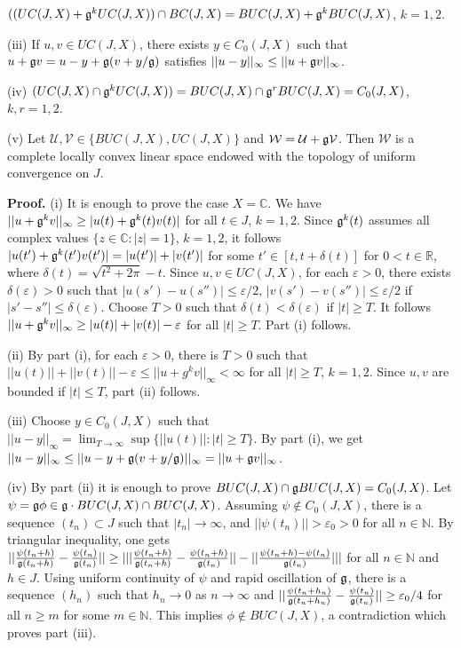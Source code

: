\documentclass[10pt,onside,reqno]{amsart}
\newcommand{\Cdb}{\mbox{$\mathbb{C}$}}
\newcommand{\Rdb}{\mbox{$\mathbb{R}$}}
\newcommand{\U}{\mbox{${\mathcal U}$}}
\newcommand{\V}{\mbox{${\mathcal V}$}}
\newcommand{\W}{\mbox{${\mathcal W}$}}
\theoremstyle{remark}
\theoremstyle{definition}
\begin{document}
             $ ((UC(J,X) +\frak{g}^k UC(J,X)) \cap BC (J,X) =  BUC (J,X) +\frak{g}^k BUC (J,X)$, $k =1, 2$.

\noindent (iii) If $u, v \in UC(J,X)$, there exists $y\in C_0 (J,X)$ such that $u+\frak{g} v=u-y +\frak{g}(v+y/\frak{g})$ satisfies  $||u-y||_{\infty}\le  ||u+\frak{g} v||_{\infty}$.


\noindent (iv) $ (UC (J,X) \cap  \frak{g}^k UC (J,X))  =BUC (J,X) \cap
\frak{g}^r BUC (J,X)
= C_0 (J,X)$, $k, r =1, 2$.



\noindent (v) Let $ \U, \V\in \{BUC(J,X), UC(J,X)\}$ and $ \W=\U+\frak {g} \V$. Then $\W$ is a complete locally convex linear space endowed with the topology of uniform convergence on $J$.
\

\noindent\textbf{Proof.} (i) It is enough to prove the case $X=\Cdb$. We have
$||u+\frak{g}^k v||_{\infty}\ge|u(t)+\frak{g}^k(t)v(t)|$ for all $t\in J$, $k=1, 2$.
Since $\frak{g}^k (t)$ assumes all complex values $\{z\in\Cdb: |z|=1\}$, $k=1, 2$, it follows $|u(t')+\frak{g}^k (t')v(t')|=|u(t')|+|v(t')|$
for some $t'\in [t,t+\delta (t)]$ for $0<t\in\Rdb$, where $\delta (t) =\sqrt {t^2+ 2\pi}-t$.
 Since $u,v \in UC (J,X)$,  for each $\varepsilon >0$, there exists $\delta (\varepsilon) > 0$ such that $|u(s')-u(s'')|\le \varepsilon/2$,  $|v(s')-v(s'')|\le \varepsilon/2$ if $|s'-s''|\le \delta (\varepsilon) $. Choose  $T>0$ such that $\delta (t) <\delta (\varepsilon) $ if $|t| \ge T$. It follows $||u+\frak{g}^k v||_{\infty}\ge |u(t)|+|v(t)|-\varepsilon$ for all $|t|\ge T$. Part (i) follows.



 (ii) By part (i), for each $\varepsilon > 0$, there is $T > 0$ such that $||u(t)||+||v(t)||-\varepsilon \le ||u+g^k v||_{\infty} < \infty$ for all $|t|\ge T$, $k=1, 2$. Since $u, v$ are bounded if $|t| \le T$, part (ii) follows.


(iii) Choose $y\in C_0 (J,X)$ such that $||u-y||_{\infty}=  {\lim}_{T\to \infty}
 \sup\{||u(t)||: |t| \ge T\}$.  By part (i), we get  $||u-y||_{\infty}\le ||u-y+\frak{g} (v+y/\frak{g})||_{\infty}= ||u+\frak{g} v||_{\infty}$.

 (iv)   By part (ii) it is enough to prove  $BUC (J,X) \cap
\frak{g} BUC (J,X)= C_0 (J,X)$. Let $\psi= \frak{g}\phi\in \frak{g}\cdot BUC(J,X)
\cap BUC(J,X)$.  Assuming $\psi\not\in C_{0}(J,X)$, there is
a sequence $(t_n)\subset J$  such that $|t_n|\to \infty$, and $||\psi
(t_n)||
> \varepsilon_0 > 0$  for all $n\in \mathbb{N}$.  By triangular inequality, one
gets $||\frac {\psi(t_n+h)}{\frak{g}(t_n+h)}- \frac
{\psi(t_n)}{\frak{g}(t_n)}||\ge |||\frac
{\psi(t_n+h)}{\frak{g}(t_n+h)}- \frac {\psi(t_n
+h)}{\frak{g}(t_n)}|| - ||\frac
{\psi(t_n+h)-\psi(t_n)}{\frak{g}(t_n)}|||$ for all $n\in \mathbb{N}$ and
$h\in J$. Using uniform continuity of $\psi$ and rapid
oscillation of
 $\frak{g}$, there is a sequence $(h_n)$ such
that $h_n\to 0$ as $n\to\infty$  and $||\frac
{\psi(t_n+h_n)}{\frak{g}(t_n+h_n)}- \frac
{\psi(t_n)}{\frak{g}(t_n)}||\ge \varepsilon_0/4$  for all $n\ge m$ for some
$m\in \mathbb{N}$. This implies $\phi\not \in BUC(J,X)$, a
contradiction which proves part (iii).
\end{document}
